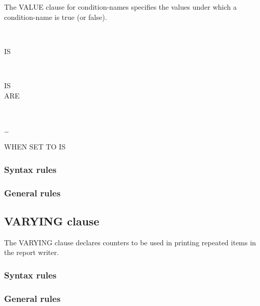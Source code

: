 The VALUE clause for condition-names specifies the values under which a condition-name is true (or false).

\begin{syntax}
  \begin{1=}
     \\
  \end{1=}
  \begin{0-1}
    IS \\
  \end{0-1}
  \literal
\end{syntax}

\begin{syntax}
  \begin{1=}
     \\
  \end{1=}
  \begin{0-1}
    IS \\
    ARE
  \end{0-1}
  \begin{1=}
    \literal
    \begin{0-1}
      \begin{1=}
         \\
      \end{1=}
      \literal
    \end{0-1}
  \end{1=} \ldots

  \begin{0-1}
    WHEN SET TO  IS \literal
  \end{0-1}
\end{syntax}

\subsubsection{Syntax rules}

\subsubsection{General rules}

\subsection{VARYING clause}

The VARYING clause declares counters to be used in printing repeated items in the report writer.

\begin{syntax}
   \identifier {}   
\end{syntax}

\subsubsection{Syntax rules}

\subsubsection{General rules}

